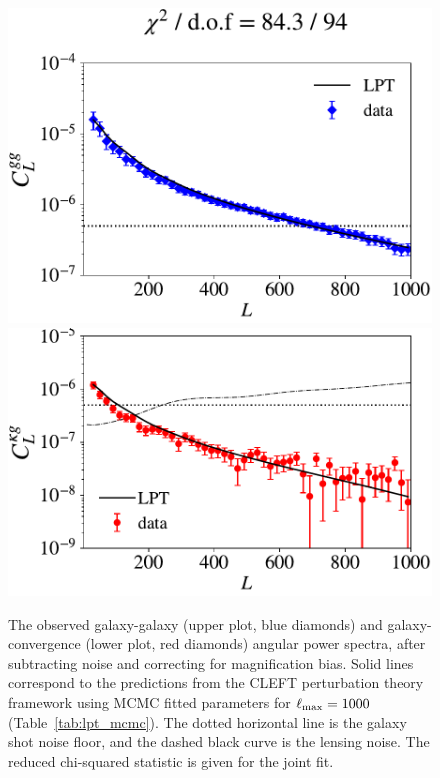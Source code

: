 \documentclass[a4paper,usenatbib]{mnras}
\begin{document}
\begin{figure}
\includegraphics[width=\linewidth]{figures/cl_gg_lpt.pdf}
\includegraphics[width=\linewidth]{figures/cl_kg_lpt.pdf}
\caption{The observed galaxy-galaxy (upper plot, blue diamonds) and galaxy-convergence (lower plot, red diamonds) angular power spectra, after subtracting noise and correcting for magnification bias. Solid lines correspond to the predictions from the CLEFT perturbation theory framework using MCMC fitted parameters for $\ell_{\rm max}=1000$ (Table~\ref{tab:lpt_mcmc}). The dotted horizontal line is the galaxy shot noise floor, and the dashed black curve is the lensing noise. The reduced chi-squared statistic is given for the joint fit.}
\label{fig:cl_lptfit}
\end{figure}
\end{document}
